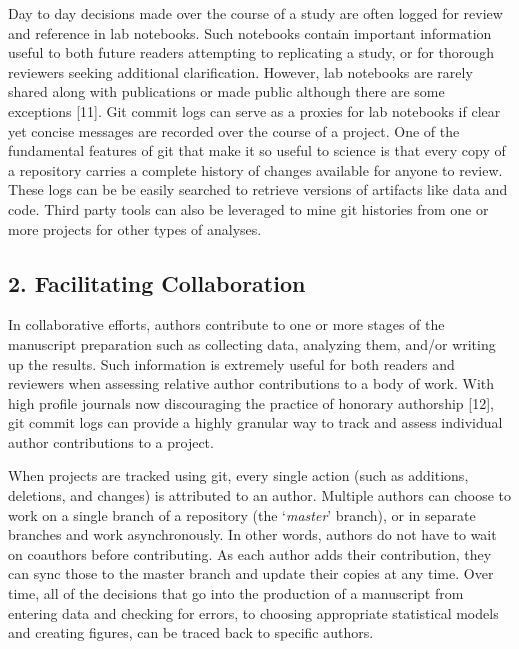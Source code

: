 \documentclass[]{article}
\begin{document}
Day to day decisions made over the course of a study are often logged
for review and reference in lab notebooks. Such notebooks contain
important information useful to both future readers attempting to
replicating a study, or for thorough reviewers seeking additional
clarification. However, lab notebooks are rarely shared along with
publications or made public although there are some exceptions {[}11{]}.
Git commit logs can serve as a proxies for lab notebooks if clear yet
concise messages are recorded over the course of a project. One of the
fundamental features of git that make it so useful to science is that
every copy of a repository carries a complete history of changes
available for anyone to review. These logs can be be easily searched to
retrieve versions of artifacts like data and code. Third party tools can
also be leveraged to mine git histories from one or more projects for
other types of analyses.

\subsection{2. Facilitating Collaboration}

In collaborative efforts, authors contribute to one or more stages of
the manuscript preparation such as collecting data, analyzing them,
and/or writing up the results. Such information is extremely useful for
both readers and reviewers when assessing relative author contributions
to a body of work. With high profile journals now discouraging the
practice of honorary authorship {[}12{]}, git commit logs can provide a
highly granular way to track and assess individual author contributions
to a project.

When projects are tracked using git, every single action (such as
additions, deletions, and changes) is attributed to an author. Multiple
authors can choose to work on a single branch of a repository (the
`\emph{master}' branch), or in separate branches and work
asynchronously. In other words, authors do not have to wait on coauthors
before contributing. As each author adds their contribution, they can
sync those to the master branch and update their copies at any time.
Over time, all of the decisions that go into the production of a
manuscript from entering data and checking for errors, to choosing
appropriate statistical models and creating figures, can be traced back
to specific authors.
\end{document}
